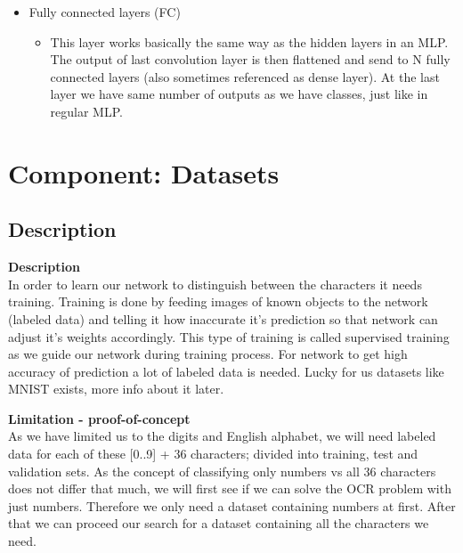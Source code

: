 \documentclass[Report.tex]{subfiles}
\begin{document}
\begin{flushleft}
\begin{itemize}
\begin{itemize}
{    Pooling makes our network rotation invariant to minor changes in angle, as outputs max/min value of a (pooling-size) block regardless of where in the block this value is.}
   \end{itemize}
   \item{Fully connected layers (FC)}
   \begin{itemize}
    \item{This layer works basically the same way as the hidden layers in an MLP.
    The output of last convolution layer is then flattened and send to N fully connected layers (also sometimes referenced as dense layer). At the last layer we have same number of outputs as we have classes, just like in regular MLP.}
   \end{itemize}
  \end{itemize}
\end{flushleft}


\section{Component: Datasets}
\label{Method:Datasets}
\subsection{Description}

\begin{flushleft}
  \textbf{Description} \\
  In order to learn our network to distinguish between the characters it needs training. Training is done by feeding images of known objects to the network (labeled data) and telling it how inaccurate it's prediction so that network can adjust it's weights accordingly. This type of training is called supervised training as we guide our network during training process.
For network to get high accuracy of prediction a lot of labeled data is needed. Lucky for us datasets like MNIST exists, more info about it later.
\end{flushleft}

\begin{flushleft}
  \textbf{Limitation - proof-of-concept} \\
  As we have limited us to the digits and English alphabet, we will need labeled data for each of these [0..9] + 36 characters; divided into training, test and validation sets. As the concept of classifying only numbers vs all 36 characters does not differ that much, we will first see if we can solve the OCR problem with just numbers. Therefore we only need a dataset containing numbers at first. After that we can proceed our search for a dataset containing all the characters we need.
\end{flushleft}
\end{document}
